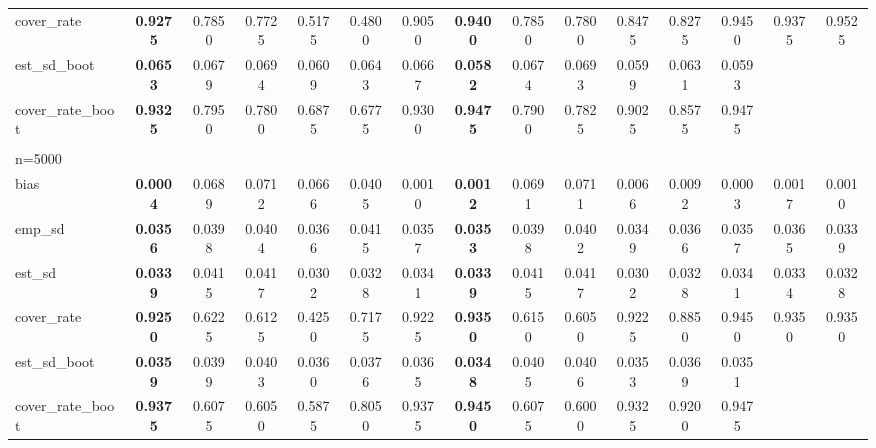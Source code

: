 \documentclass[11pt]{article}
\numberwithin{equation}{section}
\begin{document}
\begin{table}[]
{\begin{tabular}{lcccccccccccccc}
			cover\_rate & \textbf{0.9275} & 0.7850 & 0.7725 & 0.5175 & 0.4800 & 0.9050 & \textbf{0.9400} & 0.7850 & 0.7800 & 0.8475 & 0.8275 & 0.9450 & 0.9375 & 0.9525 \\
			est\_sd\_boot & \textbf{0.0653} & 0.0679 & 0.0694 & 0.0609 & 0.0643 & 0.0667 & \textbf{0.0582} & 0.0674 & 0.0693 & 0.0599 & 0.0631 & 0.0593 &  &  \\
			cover\_rate\_boot & \textbf{0.9325} & 0.7950 & 0.7800 & 0.6875 & 0.6775 & 0.9300 & \textbf{0.9475} & 0.7900 & 0.7825 & 0.9025 & 0.8575 & 0.9475 &  &  \\
			\\
			n=5000 &  &  &  &  &  &  &  &  &  &  &  &  &  &  \\
			\hline
			bias & \textbf{0.0004} & 0.0689 & 0.0712 & 0.0666 & 0.0405 & 0.0010 & \textbf{0.0012} & 0.0691 & 0.0711 & 0.0066 & 0.0092 & 0.0003 & 0.0017 & 0.0010 \\
			emp\_sd & \textbf{0.0356} & 0.0398 & 0.0404 & 0.0366 & 0.0415 & 0.0357 & \textbf{0.0353} & 0.0398 & 0.0402 & 0.0349 & 0.0366 & 0.0357 & 0.0365 & 0.0339 \\
			est\_sd & \textbf{0.0339} & 0.0415 & 0.0417 & 0.0302 & 0.0328 & 0.0341 & \textbf{0.0339} & 0.0415 & 0.0417 & 0.0302 & 0.0328 & 0.0341 & 0.0334 & 0.0328 \\
			cover\_rate & \textbf{0.9250} & 0.6225 & 0.6125 & 0.4250 & 0.7175 & 0.9225 & \textbf{0.9350} & 0.6150 & 0.6050 & 0.9225 & 0.8850 & 0.9450 & 0.9350 & 0.9350 \\
			est\_sd\_boot & \textbf{0.0359} & 0.0399 & 0.0403 & 0.0360 & 0.0376 & 0.0365 & \textbf{0.0348} & 0.0405 & 0.0406 & 0.0353 & 0.0369 & 0.0351 &  &  \\
			cover\_rate\_boot & \textbf{0.9375} & 0.6075 & 0.6050 & 0.5875 & 0.8050 & 0.9375 & \textbf{0.9450} & 0.6075 & 0.6000 & 0.9325 & 0.9200 & 0.9475 &  & \\
			\hline
		\end{tabular}
		\label{tab:simu_average_att_p5}}
\end{table}
\end{document}
